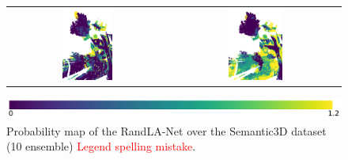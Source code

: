 \begin{figure}[h!]
\begin{tabular}{cc}
            \includegraphics[width=0.33\textwidth, height=0.18\textheight]{images/ood_imgs/de_sem3d/de_ent_10_3.pdf}&
            \includegraphics[width=0.33\textwidth, height=0.18\textheight]{images/sem3d_of/de_ent_sem3d_of_3.pdf}\\
        \end{tabular}
        \includegraphics[scale=0.45]{images/ent_legend.pdf}
        \caption{Probability map of the RandLA-Net over the Semantic3D dataset (10 ensemble) \textcolor{red}{Legend spelling mistake}.}
        \label{fig:de_entmap_vis_sem3d_OF}
    \end{figure}
